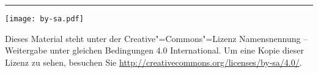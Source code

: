 \par\vspace*{\fill}

\noindent\rule{\textwidth}{1pt}

\vspace*{0.3cm}
\noindent\texttt{[image: by-sa.pdf]}
\vspace*{-0.3cm}
\hspace*{0.5cm}
\parbox{10cm}{ \sffamily
Dieses Material steht unter der Creative"=Commons"=Lizenz Namensnennung -- Weitergabe unter gleichen Bedingungen 4.0 International. Um eine Kopie dieser Lizenz zu sehen, besuchen Sie \url{http://creativecommons.org/licenses/by-sa/4.0/}.}
\vspace{0.3cm}
